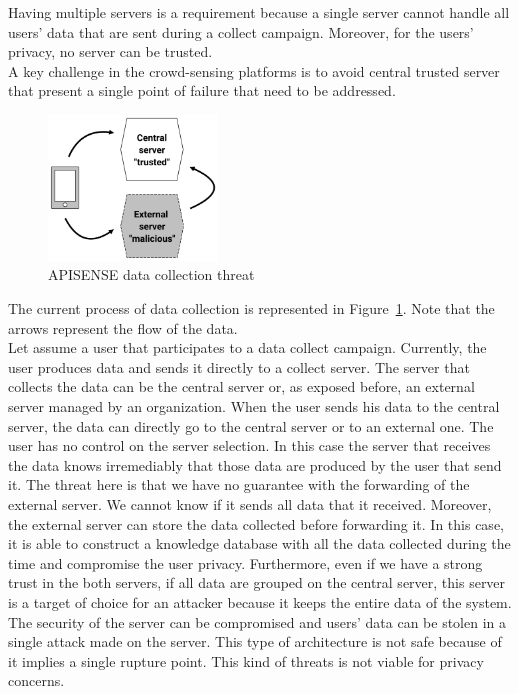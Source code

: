 Having multiple servers is a requirement because a single server cannot handle all users' data that are sent during a collect campaign.
Moreover, for the users' privacy, no server can be trusted.
\\

A key challenge in the crowd-sensing platforms is to avoid central trusted server that present a single point of failure that need to be addressed.

\begin{figure}[h]
    \centering
    \includegraphics[width=0.4\textwidth]{figures/threat}
    \caption{\label{Threat} APISENSE data collection threat}
\end{figure}

The current process of data collection is represented in Figure~\ref{Threat}.
Note that the arrows represent the flow of the data.
\\

Let assume a user that participates to a data collect campaign.
Currently, the user produces data and sends it directly to a collect server.
The server that collects the data can be the central server or, as exposed before, an external server managed by an organization.
When the user sends his data to the central server, the data can directly go to the central server or to an external one.
The user has no control on the server selection.
In this case the server that receives the data knows irremediably that those data are produced by the user that send it.
The threat here is that we have no guarantee with the forwarding of the external server.
We cannot know if it sends all data that it received.
Moreover, the external server can store the data collected before forwarding it.
In this case, it is able to construct a knowledge database with all the data collected during the time and compromise the user privacy.
Furthermore, even if we have a strong trust in the both servers, if all data are grouped on the central server, this server is a target of choice for an attacker because it keeps the entire data of the system.
The security of the server can be compromised and users' data can be stolen in a single attack made on the server.
This type of architecture is not safe because of it implies a single rupture point.
This kind of threats is not viable for privacy concerns.
\\

